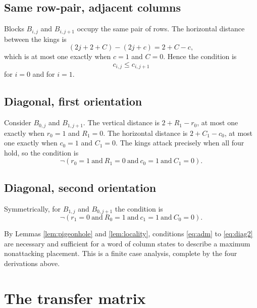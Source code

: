\documentclass[12pt]{article}
\theoremstyle{definition}
\begin{document}
\subsection{Same row-pair, adjacent columns}

Blocks $B_{i,j}$ and $B_{i,j+1}$ occupy the same pair of rows. The horizontal
distance between the kings is
\[
(2j + 2 + C) - (2j + c) = 2 + C - c,
\]
which is at most one exactly when $c = 1$ and $C = 0$. Hence the condition is
\begin{equation}
\label{eq:same}
c_{i,j} \le c_{i,j+1}
\end{equation}
for $i = 0$ and for $i = 1$.

\subsection{Diagonal, first orientation}

Consider $B_{0,j}$ and $B_{1,j+1}$. The vertical distance is $2 + R_1 - r_0$,
at most one exactly when $r_0 = 1$ and $R_1 = 0$. The horizontal distance is
$2 + C_1 - c_0$, at most one exactly when $c_0 = 1$ and $C_1 = 0$. The kings
attack precisely when all four hold, so the condition is
\begin{equation}
\label{eq:diag1}
\neg (r_0 = 1 \ \text{and}\ R_1 = 0 \ \text{and}\ c_0 = 1 \ \text{and}\ C_1 = 0).
\end{equation}

\subsection{Diagonal, second orientation}

Symmetrically, for $B_{1,j}$ and $B_{0,j+1}$ the condition is
\begin{equation}
\label{eq:diag2}
\neg (r_1 = 0 \ \text{and}\ R_0 = 1 \ \text{and}\ c_1 = 1 \ \text{and}\ C_0 = 0).
\end{equation}

By Lemmas \ref{lem:pigeonhole} and \ref{lem:locality}, conditions
\eqref{eq:adm} to \eqref{eq:diag2} are necessary and sufficient for a word of
column states to describe a maximum nonattacking placement. This is a finite
case analysis, complete by the four derivations above.

\section{The transfer matrix}
\end{document}

